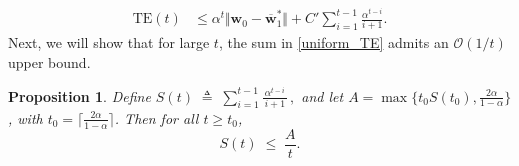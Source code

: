 \documentclass[conference]{IEEEtran}
\newcommand{\egl}[1]{{\color{blue}\bf{[EGL: #1]}}}
\newcommand{\fraz}[1]{\textcolor{purple}{\bf [Fraz: #1]}}
\newcommand{\nm}[1]{\textcolor{magenta}{\bf [NM: #1]}}
\newtheorem{prop}{Proposition}
\begin{document}
\begin{align}
    \text{TE}(t)&\leq \alpha^{t}\Vert \mathbf{w}_{0} - \overline{\mathbf{w}}^*_{1}\Vert+ C'\sum_{i=1}^{t-1}  \frac{\alpha^{t-i}}{i+1
    }. \label{uniform_TE}
\end{align}
Next, we will show that for large $t$, the sum in \eqref{uniform_TE} admits an $\mathcal{O}(1/t)$ upper bound.
\begin{prop}
\label{prop:uniform_sum}
Define $S(t)\;\triangleq\;\sum_{i=1}^{t-1}\frac{\alpha^{t-i}}{\,i+1\,}\,,$ and let $A=\max\{t_0 S(t_0), \frac{2\alpha}{1-\alpha}\}$, with  $t_0 = \lceil \frac{2\alpha}{1-\alpha}\rceil$. Then for all $t\geq t_0 $, %
$$S(t)\;\leq\;\frac{A}{t}.$$ 
\end{prop}
\end{document}
